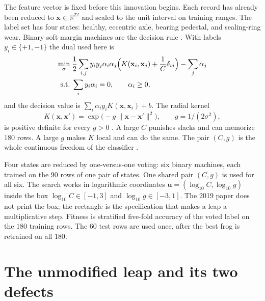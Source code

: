 \documentclass[11pt,a4paper]{article}
\newcommand{\vect}[1]{\mathbf{#1}}
\begin{document}
The feature vector is fixed before this innovation begins.
Each record has already been reduced to $\vect{x}\in\mathbb{R}^{22}$ and scaled to the unit interval on training ranges.
The label set has four states: healthy, eccentric axle, bearing pedestal, and sealing-ring wear.
Binary soft-margin machines are the decision rule \cite{cortes1995,vapnik1995}.
With labels $y_i\in\{+1,-1\}$ the dual used here is
\begin{equation}
\begin{aligned}
\min_{\alpha}\;&
\frac12\sum_{i,j} y_i y_j \alpha_i \alpha_j
\Bigl(K(\vect{x}_i,\vect{x}_j)+\frac{1}{C}\delta_{ij}\Bigr)
-\sum_j \alpha_j\\
\text{s.t.}\;&
\sum_i y_i\alpha_i=0,\qquad \alpha_i\ge 0,
\end{aligned}
\label{eq:dual}
\end{equation}
and the decision value is $\sum_i \alpha_i y_i K(\vect{x},\vect{x}_i)+b$.
The radial kernel
\begin{equation}
K(\vect{x},\vect{x}')=\exp\bigl(-g\,\lVert\vect{x}-\vect{x}'\rVert^{2}\bigr),
\qquad g=1/(2\sigma^{2}),
\label{eq:rbf}
\end{equation}
is positive definite for every $g>0$ \cite{scholkopf2002}.
A large $C$ punishes slacks and can memorize $180$ rows.
A large $g$ makes $K$ local and can do the same.
The pair $(C,g)$ is the whole continuous freedom of the classifier \cite{hsu2003,widodo2007}.

Four states are reduced by one-versus-one voting: six binary machines, each trained on the $90$ rows of one pair of states.
One shared pair $(C,g)$ is used for all six.
The search works in logarithmic coordinates $\vect{u}=(\log_{10} C,\log_{10} g)$ inside the box $\log_{10} C\in[-1,3]$ and $\log_{10} g\in[-3,1]$.
The 2019 paper does not print the box; the rectangle is the specification that makes a leap a multiplicative step.
Fitness is stratified five-fold accuracy of the voted label on the $180$ training rows.
The $60$ test rows are used once, after the best frog is retrained on all $180$.

\section{The unmodified leap and its two defects}
\end{document}
